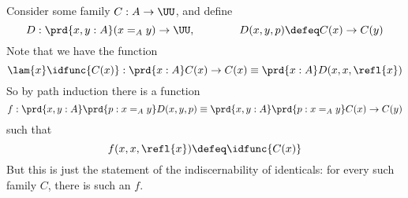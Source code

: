  \soln
Consider some family $C : A \to \UU$, and define
\[
D : \prd{x, y : A} (x =_{A} y) \to \UU,
\qquad\qquad
D(x, y, p) \defeq C(x) \to C(y)
\]
Note that we have the function
\[
  \lam{x}\idfunc{C(x)} : 
  \prd{x:A} C(x) \to C(x)
  \equiv
  \prd{x:A} D(x, x, \refl{x}) 
\]
So by path induction there is a function
\[
  f : 
  \prd{x, y : A} \prd{p : x =_{A} y} D(x, y, p)
  \equiv
  \prd{x, y : A} \prd{p : x =_{A} y} C(x) \to C(y)
\]
such that
\[
  f(x, x, \refl{x}) \defeq \idfunc{C(x)}
\]
But this is just the statement of the indiscernability of identicals: for every
such family $C$, there is such an $f$.
\begin{coqdoccode}
\end{coqdoccode}
